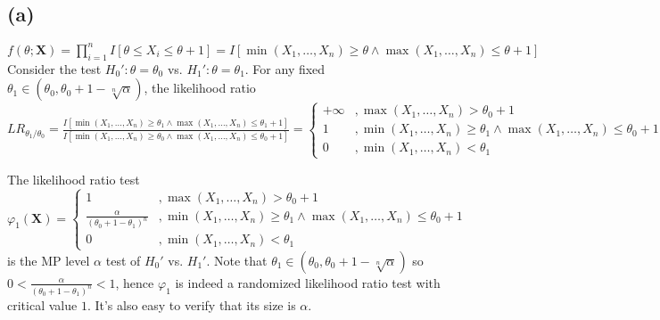 \subsection*{(a)}
$
f(\theta; \mathbf{X}) =
\prod_{i=1}^{n} I[\theta \leq X_i \leq \theta+1] =
I[\min(X_1, \dots, X_n) \geq \theta \wedge \max(X_1, \dots, X_n) \leq \theta+1]
$
\\
Consider the test $H_0': \theta=\theta_0$ vs. $H_1': \theta=\theta_1$.
For any fixed $\theta_1 \in (\theta_0, \theta_0+1-\sqrt[n]{\alpha})$, the likelihood ratio \\
$
LR_{\theta_1/\theta_0} =
\frac{
I[\min(X_1, \dots, X_n) \geq \theta_1 \wedge \max(X_1, \dots, X_n) \leq \theta_1+1]
}
{
I[\min(X_1, \dots, X_n) \geq \theta_0 \wedge \max(X_1, \dots, X_n) \leq \theta_0+1]
} =
\left\{\begin{array}{cl}
+\infty & , \max(X_1, \dots, X_n) > \theta_0+1
\\
1 & , \min(X_1, \dots, X_n) \geq \theta_1 \wedge \max(X_1, \dots, X_n) \leq \theta_0+1
\\
0 & , \min(X_1, \dots, X_n) < \theta_1
\end{array}\right.
$

The likelihood ratio test
$
\varphi_1(\mathbf{X}) =
\left\{\begin{array}{cl}
1 & , \max(X_1, \dots, X_n) > \theta_0+1
\\
\frac{\alpha}{(\theta_0+1-\theta_1)^n} & , \min(X_1, \dots, X_n) \geq \theta_1 \wedge \max(X_1, \dots, X_n) \leq \theta_0+1
\\
0 & , \min(X_1, \dots, X_n) < \theta_1
\end{array}\right.
$
\\
is the MP level $\alpha$ test of $H_0'$ vs. $H_1'$.
Note that $\theta_1 \in (\theta_0, \theta_0+1-\sqrt[n]{\alpha})$ so
$0 < \frac{\alpha}{(\theta_0+1-\theta_1)^n} <1$,
hence $\varphi_1$ is indeed a randomized likelihood ratio test with critical value $1$.
It's also easy to verify that its size is $\alpha$.

